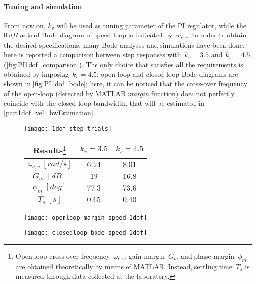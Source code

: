 \paragraph{Tuning and simulation}
From now on, $k_v$ will be used as tuning parameter of the PI regulator, while the~$0\ dB$ axis of Bode diagram of speed loop is indicated by~$w_{c,v}$. In order to obtain the desired specifications, many Bode analyses and simulations have been done: here is reported a comparison between step responses with~$k_v=3.5$ and~$k_v=4.5$ (\cref{fig:PI1dof_comparison}).
The only choice that satisfies all the requirements is obtained by imposing~$k_v = 4.5$: open-loop and closed-loop Bode diagrams are shown in \cref{fig:PI1dof_bode}; here, it can be noticed that the cross-over frequency of the open-loop (detected by MATLAB \textit{margin} function) does not perfectly coincide with the closed-loop bandwidth, that will be estimated in \cref{par:1dof_vel_bwEstimation}.
\begin{figure*}[h]
	\centering
	\begin{subfigure}{0.45\columnwidth}
		\texttt{[image: 1dof\_step\_trials]}
		\label{fig:PI1dof_step}
	\end{subfigure}
	\begin{subfigure}{0.45\columnwidth}
		\centering
		\begin{tabular}{|c|cc|}
			\hline
			Results\footnote{Open-loop cross-over frequency~$\omega_{c,v}$, gain margin~$G_m$ and phase margin~$\phi_m$ are obtained theoretically by means of MATLAB. Instead, settling time~$T_s$ is measured through data collected at the laboratory.} & $k_v=3.5$ & $k_v=4.5$ \\
			\hline
			$\omega_{c,v}\ [rad/s]$ & $6.24$ & $8.01$ \\
			$G_m\ [dB]$ & $19$ & $16.8$ \\
			$\phi_m\ [deg]$ & $77.3$ & $73.6$ \\
			\hline
			$T_s\ [s]$ & $0.65$ & $0.40$ \\
			\hline
		\end{tabular}
	\end{subfigure}
	\caption{Comparisons between $k_v = 3.5$ and $k_v = 4.5$ cases}
	\label{fig:PI1dof_comparison}
	\begin{subfigure}{0.45\columnwidth}
		\texttt{[image: openloop\_margin\_speed\_1dof]}
		\label{fig:PI1dof_bode_openLoop}
	\end{subfigure}
	\begin{subfigure}{0.45\columnwidth}
		\texttt{[image: closedloop\_bode\_speed\_1dof]}
		\label{fig:PI1dof_bode_closedLoop}
	\end{subfigure}
	\caption{Bode diagrams with $k_v = 4.5$}
	\label{fig:PI1dof_bode}
\end{figure*}

